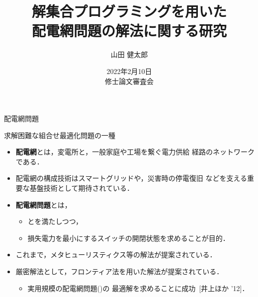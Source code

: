 \documentclass[dvipdfmx,11pt]{beamer}
\title{解集合プログラミングを用いた\\配電網問題の解法に関する研究}
\author[山田 健太郎]{山田 健太郎}
\date{2022年2月10日\\修士論文審査会}
\institute{情報システム学専攻\\番原研究室}
\begin{document}
\begin{frame}{}
  \titlepage
\end{frame}

\begin{frame}{配電網問題}
  \begin{alertblock}{}\centering
    求解困難な組合せ最適化問題の一種
  \end{alertblock}
  \vfill
  \begin{itemize}
  \item \alert{\bf 配電網}とは，変電所と，一般家庭や工場を繋ぐ電力供給
    経路のネットワークである．
  \item  配電網の構成技術はスマートグリッドや，災害時の停電復旧
         などを支える重要な基盤技術として期待されている．
  \item \alert{\bf 配電網問題}とは，
    \begin{itemize}
    \item {}とを満たしつつ，
    \item 損失電力を最小にするスイッチの開閉状態を求めることが目的．
    \end{itemize}
  \item これまで，メタヒューリスティクス等の解法が提案されている．
  \item 厳密解法として，フロンティア法を用いた解法が提案されている．
    \begin{itemize}
    \item 実用規模の配電網問題()の
      最適解を求めることに成功~[井上ほか '12]．
    \end{itemize}
  \end{itemize}
\end{frame}
\end{document}
